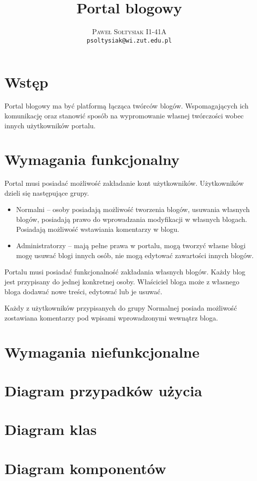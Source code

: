 \documentclass{article}
\title{Portal blogowy}
\author{\textsc{Paweł Sołtysiak I1-41A} \\ \texttt{psoltysiak@wi.zut.edu.pl}}
\begin{document}
\maketitle
\section{Wstęp}
Portal blogowy ma być platformą łącząca twórców blogów. Wspomagających ich komunikację oraz stanowić sposób na wypromowanie własnej twórczości wobec innych użytkowników portalu.



\section{Wymagania funkcjonalny}
Portal musi posiadać możliwość zakładanie kont użytkowników. Użytkowników dzieli się następujące grupy.
\begin{itemize}
\item Normalni -- osoby posiadają możliwość tworzenia blogów, usuwania własnych blogów, posiadają prawo do wprowadzania modyfikacji w własnych blogach. Posiadają możliwość wstawiania komentarzy w blogu.
\item Administratorzy -- mają pełne prawa w portalu, mogą tworzyć własne blogi mogę usuwać blogi innych osób, nie mogą edytować zawartości innych blogów.
\end{itemize}

Portalu musi posiadać funkcjonalność zakładania własnych blogów. Każdy blog jest przypisany do jednej konkretnej osoby. Właściciel bloga może z własnego bloga dodawać nowe treści, edytować lub je usuwać.

Każdy z użytkowników przypisanych do grupy Normalnej posiada możliwość zostawiana komentarzy pod wpisami wprowadzonymi wewnątrz bloga.

\section{Wymagania niefunkcjonalne}
\section{Diagram przypadków użycia}
\section{Diagram klas}
\section{Diagram komponentów}
\end{document}
